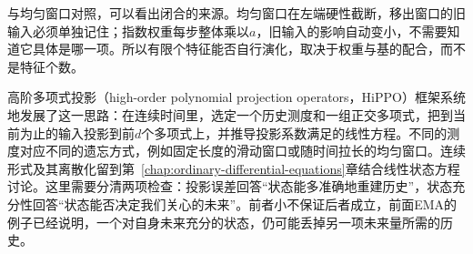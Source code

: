 与均匀窗口对照，可以看出闭合的来源。均匀窗口在左端硬性截断，移出窗口的旧输入必须单独记住；指数权重每步整体乘以$a$，旧输入的影响自动变小，不需要知道它具体是哪一项。所以有限个特征能否自行演化，取决于权重与基的配合，而不是特征个数。

高阶多项式投影（high-order polynomial projection operators，HiPPO）框架系统地发展了这一思路：在连续时间里，选定一个历史测度和一组正交多项式，把到当前为止的输入投影到前$d$个多项式上，并推导投影系数满足的线性方程。不同的测度对应不同的遗忘方式，例如固定长度的滑动窗口或随时间拉长的均匀窗口。连续形式及其离散化留到第~\ref{chap:ordinary-differential-equations}章结合线性状态方程讨论。这里需要分清两项检查：投影误差回答“状态能多准确地重建历史”，状态充分性回答“状态能否决定我们关心的未来”。前者小不保证后者成立，前面EMA的例子已经说明，一个对自身未来充分的状态，仍可能丢掉另一项未来量所需的历史。
